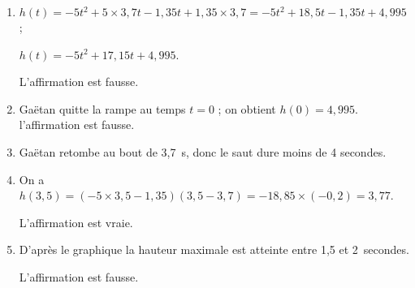 \begin{enumerate}
\item %
$h(t) = - 5t^2 + 5 \times 3,7t - 1,35t + 1,35 \times 3,7 = - 5t^2 + 18,5t - 1,35t + 4,995$ ;

$h(t) = - 5t^2 + 17,15t + 4,995$.

L'affirmation est fausse.
\item %
Gaëtan quitte la rampe au temps $t = 0$ ; on obtient $h(0) = 4,995$. l'affirmation est fausse.
\item %
Gaëtan retombe au bout de 3,7~s, donc le saut dure moins de 4 secondes.
\item %
On a $h(3,5) = (- 5 \times 3,5 - 1,35)(3,5 - 3,7)  = - 18,85 \times ( - 0,2) = 3,77$.

L'affirmation est vraie.
\item %
D'après le graphique la hauteur maximale est atteinte entre 1,5 et 2~secondes.

L'affirmation est fausse.
\end{enumerate}

\vspace{0,5cm}

